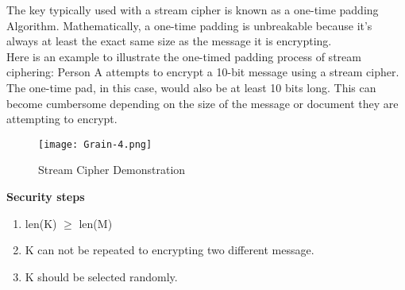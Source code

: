 The key typically used with a stream cipher is known as a one-time padding Algorithm. Mathematically, a one-time padding is unbreakable because it's always at least the exact same size as the message it is encrypting.\\

Here is an example to illustrate the one-timed padding process of stream ciphering: Person A attempts to encrypt a 10-bit message using a stream cipher. The one-time pad, in this case, would also be at least 10 bits long. This can become cumbersome depending on the size of the message or document they are attempting to encrypt. 
\begin{figure}[h]
	\centering
	\texttt{[image: Grain-4.png]}
	\caption{Stream Cipher Demonstration}
\end{figure}

\textbf{Security steps }
\begin{enumerate}
	\item {len(K) $\geq$ len(M)}
	\item {K can not be repeated to encrypting two different message.}
	\item {K should be selected randomly.}
\end{enumerate}


